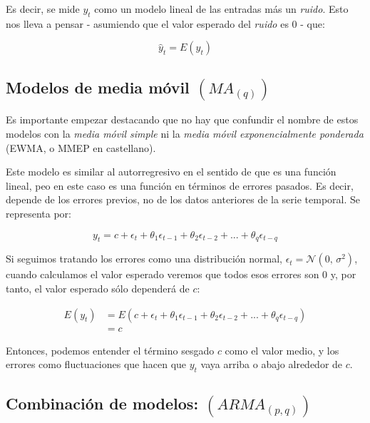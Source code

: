 Es decir, se mide $y_{t}$ como un modelo lineal de las entradas más un \emph{ruido}. Esto nos lleva a pensar - asumiendo que el valor esperado del \emph{ruido} es 0 - que:

\begin{equation}
	\hat{y}_{t} = E(y_{t})
\end{equation}



\subsection{Modelos de media móvil $(MA_{(q)})$}

Es importante empezar destacando que no hay que confundir el nombre de estos modelos con la \emph{media móvil simple} ni la \emph{media móvil exponencialmente ponderada} (EWMA, o MMEP en castellano). 

Este modelo es similar al autorregresivo en el sentido de que es una función lineal, peo en este caso es una función en términos de errores pasados. Es decir, depende de los errores previos, no de los datos anteriores de la serie temporal. Se representa por:

\begin{equation}
	y_{t} = c + \epsilon_{t} + \theta_{1}\epsilon_{t-1} + \theta_{2}\epsilon_{t-2} + ... + \theta_{q}\epsilon_{t-q}
\end{equation}


Si seguimos tratando los errores como una distribución normal, $\epsilon_{t} = \mathcal{N}(0,\,\sigma^{2})$, cuando calculamos el valor esperado veremos que todos esos errores son 0 y, por tanto, el valor esperado sólo dependerá de $c$:

\begin{equation}
\begin{aligned}
	E(y_{t}) &= E(c + \epsilon_{t} + \theta_{1}\epsilon_{t-1} + \theta_{2}\epsilon_{t-2} + ... + \theta_{q}\epsilon_{t-q}) \\ 
	&= c
\end{aligned}
\end{equation}

Entonces, podemos entender el término sesgado $c$ como el valor medio, y los errores como fluctuaciones que hacen que $y_{t}$ vaya arriba o abajo alrededor de $c$. 


\subsection{Combinación de modelos: $(ARMA_{(p, q)})$}

